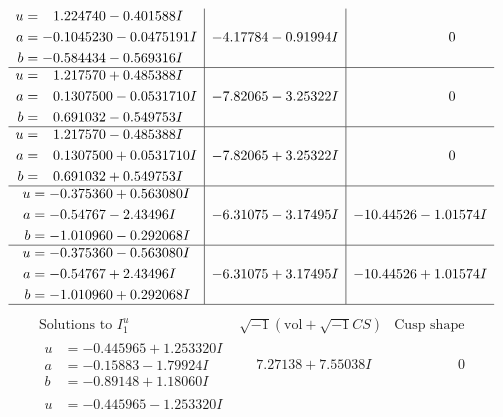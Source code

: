 \documentclass[1p]{elsarticle_modified}
\theoremstyle{definition}
\newcommand{\I}{\sqrt{-1}}
\begin{document}
$$\begin{array}{c|c|c}
\begin{aligned}
u &= \phantom{-}1.224740 - 0.401588 I \\
a &= -0.1045230 - 0.0475191 I \\
b &= -0.584434 - 0.569316 I\end{aligned}
 & -4.17784 - 0.91994 I & \phantom{-0.000000 } 0 \\ \hline\begin{aligned}
u &= \phantom{-}1.217570 + 0.485388 I \\
a &= \phantom{-}0.1307500 - 0.0531710 I \\
b &= \phantom{-}0.691032 - 0.549753 I\end{aligned}
 & -7.82065 - 3.25322 I & \phantom{-0.000000 } 0 \\ \hline\begin{aligned}
u &= \phantom{-}1.217570 - 0.485388 I \\
a &= \phantom{-}0.1307500 + 0.0531710 I \\
b &= \phantom{-}0.691032 + 0.549753 I\end{aligned}
 & -7.82065 + 3.25322 I & \phantom{-0.000000 } 0 \\ \hline\begin{aligned}
u &= -0.375360 + 0.563080 I \\
a &= -0.54767 - 2.43496 I \\
b &= -1.010960 - 0.292068 I\end{aligned}
 & -6.31075 - 3.17495 I & -10.44526 - 1.01574 I \\ \hline\begin{aligned}
u &= -0.375360 - 0.563080 I \\
a &= -0.54767 + 2.43496 I \\
b &= -1.010960 + 0.292068 I\end{aligned}
 & -6.31075 + 3.17495 I & -10.44526 + 1.01574 I\\
 \hline 
 \end{array}$$\newpage$$\begin{array}{c|c|c}  
\text{Solutions to }I^u_{1}& \I (\text{vol} + \sqrt{-1}CS) & \text{Cusp shape}\\
 \hline 
\begin{aligned}
u &= -0.445965 + 1.253320 I \\
a &= -0.15883 - 1.79924 I \\
b &= -0.89148 + 1.18060 I\end{aligned}
 & \phantom{-}7.27138 + 7.55038 I & \phantom{-0.000000 } 0 \\ \hline\begin{aligned}
u &= -0.445965 - 1.253320 I \\

\end{aligned}
\end{array}$$
\end{document}
